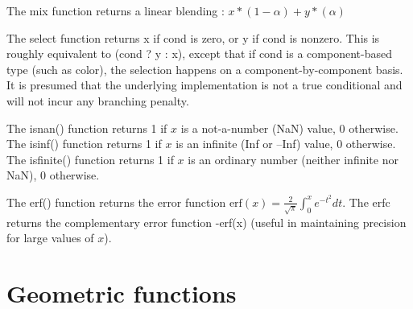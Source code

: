\documentclass[11pt,letterpaper]{book}
\begin{document}
The {\cf mix} function returns a linear blending :
$ x*(1-\alpha) + y*(\alpha) $
\apiend

The {\cf select} function returns {\cf x} if {\cf cond} is zero, or {\cf y}
if {\cf cond} is nonzero. This is roughly equivalent to {\cf (cond ? y : x)},
except that if {\cf cond} is a component-based type (such as {\cf color}),
the selection happens on a component-by-component basis. It is presumed
that the underlying implementation is not a true conditional and will not
incur any branching penalty.
\apiend

  
The {\cf isnan()} function returns 1 if $x$ is a not-a-number (NaN)
value, 0 otherwise.  The {\cf isinf()} function returns 1 if $x$ is an
infinite (Inf or --Inf) value, 0 otherwise.  The {\cf isfinite()}
function returns 1 if $x$ is an ordinary number (neither infinite nor
NaN), 0 otherwise.  \apiend

 
The {\cf erf()} function returns the error function 
${\mathrm{erf}(x) = \frac{2}{\sqrt{\pi}} \int_0^x e^{-t^2}} dt$.
The {\cf erfc} returns the complementary error function {-erf(x)}
(useful in maintaining precision for large values of $x$).
\apiend

\section{Geometric functions}
\label{sec:stdlib:geom}

\end{document}
